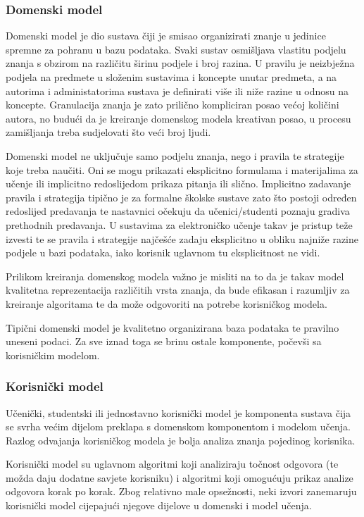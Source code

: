 \documentclass[times, utf8, zavrsni]{fer}
\begin{document}
\subsubsection{Domenski model}
Domenski model je dio sustava čiji je smisao organizirati znanje u jedinice spremne za pohranu u bazu podataka. Svaki sustav osmišljava vlastitu podjelu znanja s obzirom na različitu širinu podjele i broj razina. U pravilu je neizbježna podjela na predmete u složenim sustavima i koncepte unutar predmeta, a na autorima i administatorima sustava je definirati više ili niže razine u odnosu na koncepte. Granulacija znanja je zato prilično kompliciran posao većoj količini autora, no budući da je kreiranje domenskog modela kreativan posao, u procesu zamišljanja treba sudjelovati što veći broj ljudi.
\par
Domenski model ne uključuje samo podjelu znanja, nego i pravila te strategije koje treba naučiti. Oni se mogu prikazati eksplicitno formulama i materijalima za učenje ili implicitno redoslijedom prikaza pitanja ili slično. Implicitno zadavanje pravila i strategija tipično je za formalne školske sustave zato što postoji određen redoslijed predavanja te nastavnici očekuju da učenici/studenti poznaju gradiva prethodnih predavanja. U sustavima za elektroničko učenje takav je pristup teže izvesti te se pravila i strategije najčešće zadaju eksplicitno u obliku najniže razine podjele u bazi podataka, iako korisnik uglavnom tu eksplicitnost ne vidi.
\par
Prilikom kreiranja domenskog modela važno je misliti na to da je takav model kvalitetna reprezentacija različitih vrsta znanja, da bude efikasan i razumljiv za kreiranje algoritama te da može odgovoriti na potrebe korisničkog modela.
\par
Tipični domenski model je kvalitetno organizirana baza podataka te pravilno uneseni podaci. Za sve iznad toga se brinu ostale komponente, počevši sa korisničkim modelom.

\subsubsection{Korisnički model}
Učenički, studentski ili jednostavno korisnički model je komponenta sustava čija se svrha većim dijelom preklapa s domenskom komponentom i modelom učenja. Razlog odvajanja korisničkog modela je bolja analiza znanja pojedinog korisnika. 
\par
Korisnički model su uglavnom algoritmi koji analiziraju točnost odgovora (te možda daju dodatne savjete korisniku) i algoritmi koji omogućuju prikaz analize odgovora korak po korak. Zbog relativno male opsežnosti, neki izvori zanemaruju korisnički model cijepajući njegove dijelove u domenski i model učenja.
\end{document}
